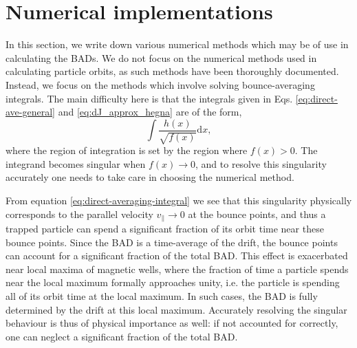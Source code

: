 \section{Numerical implementations}
In this section, we write down various numerical methods which may be of use in calculating the BADs. We do not focus on the numerical methods used in calculating particle orbits, as such methods have been thoroughly documented. Instead, we focus on the methods which involve solving bounce-averaging integrals. The main difficulty here is that the integrals given in Eqs. \eqref{eq:direct-ave-general} and \eqref{eq:dJ_approx_hegna} are of the form,
\begin{equation}
    \int \frac{h(x)}{\sqrt{f(x)}} \mathrm{d} x ,
    \label{eq:b-ave-integrals-general}
\end{equation}
where the region of integration is set by the region where $f(x)>0$. The integrand becomes singular when $f(x) \rightarrow 0$, and to resolve this singularity accurately one needs to take care in choosing the numerical method. \par  
From equation \eqref{eq:direct-averaging-integral} we see that this singularity physically corresponds to the parallel velocity $v_\parallel \rightarrow 0$ at the bounce points, and thus a trapped particle can spend a significant fraction of its orbit time near these bounce points. Since the BAD is a time-average of the drift, the bounce points can account for a significant fraction of the total BAD. This effect is exacerbated near local maxima of magnetic wells, where the fraction of time a particle spends near the local maximum formally approaches unity, i.e. the particle is spending all of its orbit time at the local maximum. In such cases, the BAD is fully determined by the drift at this local maximum. Accurately resolving the singular behaviour is thus of physical importance as well: if not accounted for correctly, one can neglect a significant fraction of the total BAD.
